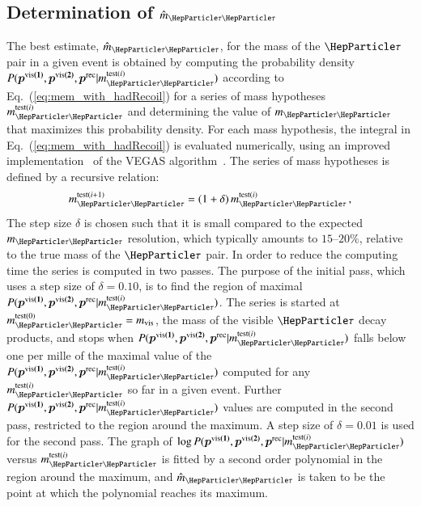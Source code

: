 \subsection{Determination of $\hat{m}_{\Pgt\Pgt}$}
\label{sec:mem_numericalMaximization}

The best estimate, $\hat{m}_{\Pgt\Pgt}$, for the mass of the $\Pgt$ pair in a given event
is obtained by computing the probability density $P(\bm{p^{\vis(1)}},\bm{p^{\vis(2)}},\bm{p^{\rec}}|m_{\Pgt\Pgt}^{\textrm{test}(i)})$ according to Eq.~(\ref{eq:mem_with_hadRecoil}) 
for a series of mass hypotheses $m_{\Pgt\Pgt}^{\textrm{test}(i)}$ and determining the value of $m_{\Pgt\Pgt}$ that maximizes this probability density.
For each mass hypothesis, the integral in Eq.~(\ref{eq:mem_with_hadRecoil}) is evaluated numerically,
using an improved implementation~\cite{VAMP} of the \textsc{VEGAS} algorithm~\cite{VEGAS}.
The series of mass hypotheses is defined by a recursive relation: 
\begin{equation}
m_{\Pgt\Pgt}^{\textrm{test}(i + 1)} = (1 + \delta) \,  m_{\Pgt\Pgt}^{\textrm{test}(i)} \, ,
\label{eq:mTauTau_step_size}
\end{equation}
The step size $\delta$ is chosen such that it is small compared to the expected $m_{\Pgt\Pgt}$ resolution,
which typically amounts to $15$--$20\%$, relative to the true mass of the $\Pgt$ pair.
In order to reduce the computing time the series is computed in two passes.
The purpose of the initial pass, which uses a step size of $\delta = 0.10$, is to find the region of maximal $P(\bm{p^{\vis(1)}},\bm{p^{\vis(2)}},\bm{p^{\rec}}|m_{\Pgt\Pgt}^{\textrm{test}(i)})$.
The series is started at $m_{\Pgt\Pgt}^{\textrm{test}(0)} = m_{\vis}$,
the mass of the visible $\Pgt$ decay products, 
and stops when $P(\bm{p^{\vis(1)}},\bm{p^{\vis(2)}},\bm{p^{\rec}}|m_{\Pgt\Pgt}^{\textrm{test}(i)})$ falls below one per mille of the maximal value of the $P(\bm{p^{\vis(1)}},\bm{p^{\vis(2)}},\bm{p^{\rec}}|m_{\Pgt\Pgt}^{\textrm{test}(i)})$ 
computed for any $m_{\Pgt\Pgt}^{\textrm{test}(i)}$ so far in a given event.
Further $P(\bm{p^{\vis(1)}},\bm{p^{\vis(2)}},\bm{p^{\rec}}|m_{\Pgt\Pgt}^{\textrm{test}(i)})$ values are computed in the second pass,
restricted to the region around the maximum.
A step size of $\delta = 0.01$ is used for the second pass.
The graph of $\log P(\bm{p^{\vis(1)}},\bm{p^{\vis(2)}},\bm{p^{\rec}}|m_{\Pgt\Pgt}^{\textrm{test}(i)})$ versus $m_{\Pgt\Pgt}^{\textrm{test}(i)}$ is fitted by a second order polynomial
in the region around the maximum,
and $\hat{m}_{\Pgt\Pgt}$ is taken to be the point at which the polynomial reaches its maximum.
